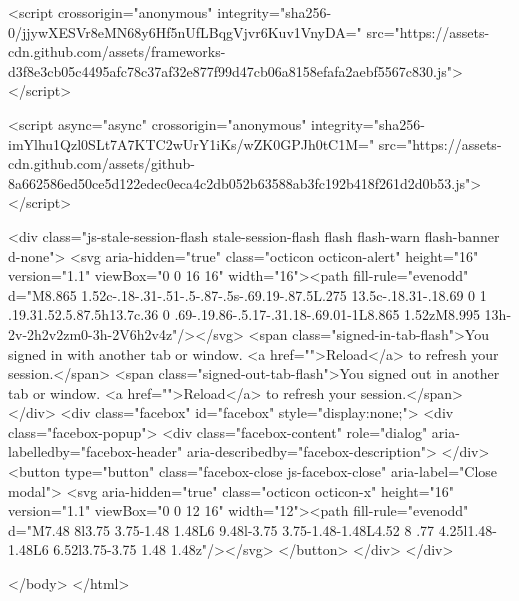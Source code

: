     
    <script crossorigin="anonymous" integrity="sha256-0/jjywXESVr8eMN68y6Hf5nUfLBqgVjvr6Kuv1VnyDA=" src="https://assets-cdn.github.com/assets/frameworks-d3f8e3cb05c4495afc78c37af32e877f99d47cb06a8158efafa2aebf5567c830.js"></script>
    
    <script async="async" crossorigin="anonymous" integrity="sha256-imYlhu1Qzl0SLt7A7KTC2wUrY1iKs/wZK0GPJh0tC1M=" src="https://assets-cdn.github.com/assets/github-8a662586ed50ce5d122edec0eca4c2db052b63588ab3fc192b418f261d2d0b53.js"></script>
    
    
    
    
  <div class="js-stale-session-flash stale-session-flash flash flash-warn flash-banner d-none">
    <svg aria-hidden="true" class="octicon octicon-alert" height="16" version="1.1" viewBox="0 0 16 16" width="16"><path fill-rule="evenodd" d="M8.865 1.52c-.18-.31-.51-.5-.87-.5s-.69.19-.87.5L.275 13.5c-.18.31-.18.69 0 1 .19.31.52.5.87.5h13.7c.36 0 .69-.19.86-.5.17-.31.18-.69.01-1L8.865 1.52zM8.995 13h-2v-2h2v2zm0-3h-2V6h2v4z"/></svg>
    <span class="signed-in-tab-flash">You signed in with another tab or window. <a href="">Reload</a> to refresh your session.</span>
    <span class="signed-out-tab-flash">You signed out in another tab or window. <a href="">Reload</a> to refresh your session.</span>
  </div>
  <div class="facebox" id="facebox" style="display:none;">
  <div class="facebox-popup">
    <div class="facebox-content" role="dialog" aria-labelledby="facebox-header" aria-describedby="facebox-description">
    </div>
    <button type="button" class="facebox-close js-facebox-close" aria-label="Close modal">
      <svg aria-hidden="true" class="octicon octicon-x" height="16" version="1.1" viewBox="0 0 12 16" width="12"><path fill-rule="evenodd" d="M7.48 8l3.75 3.75-1.48 1.48L6 9.48l-3.75 3.75-1.48-1.48L4.52 8 .77 4.25l1.48-1.48L6 6.52l3.75-3.75 1.48 1.48z"/></svg>
    </button>
  </div>
</div>


  </body>
</html>

